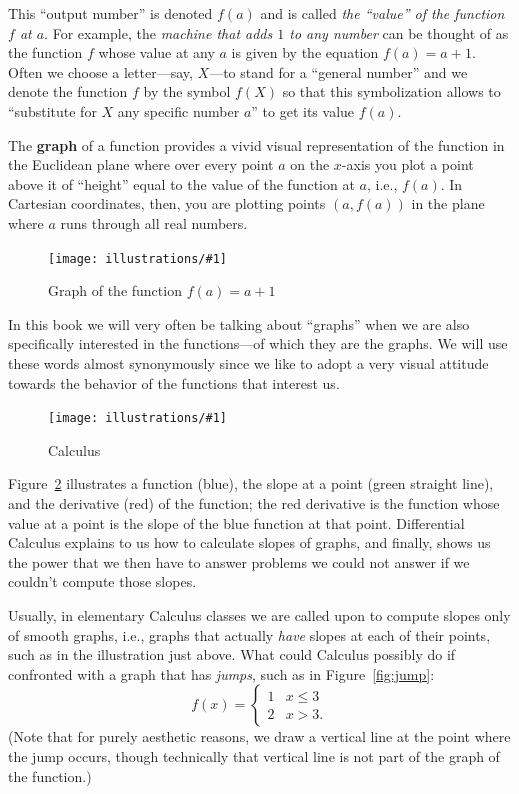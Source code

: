 \documentclass[openany]{book}
\newcommand{\ill}[3]{%
   \begin{figure}[H]%
   \vspace{-2ex}
   \centering%
   \texttt{[image: illustrations/\#1]}%
   \caption{#3}%
   \vspace{-2ex}
    \end{figure}}
\theoremstyle{plain}
\theoremstyle{definition}
\begin{document}
{ This ``output number'' is denoted $f(a)$ and is called {\it the
   ``value'' of the function $f$ at $a$}.  For example, the {\it
   machine that adds $1$ to any number} can be thought of as the
 function $f$ whose value at any $a$ is given by the equation $f(a) =
 a+1$.  Often we choose a letter---say, $X$---to stand for a ``general
 number'' and we denote the function $f$ by the symbol $f(X)$ so that
 this symbolization allows to ``substitute for $X$ any specific number
 $a$'' to get its value $f(a)$.

 The {\bf graph} of a function provides a vivid visual representation of the
 function in the Euclidean plane where over every point $a$ on the
 $x$-axis you plot a point above it of ``height'' equal to the value of
 the function at $a$, i.e., $f(a)$. In Cartesian coordinates, then,
 you are plotting points $(a, f(a))$ in the plane where $a$ runs
 through all real numbers.

 \ill{graph_aplusone}{0.6}{Graph of the function $f(a)=a+1$\label{fig:graph_aplusone}}

 In this book we will very often be talking about ``graphs'' when we
 are also specifically interested in the functions---of which they are
 the graphs. We will use these words almost synonymously since we like
 to adopt a very visual attitude towards the behavior of the functions
 that interest us.


 \ill{graph_slope_deriv}{1}{\label{fig:graph_slope_deriv}Calculus}



 Figure~\ref{fig:graph_slope_deriv} illustrates a function (blue), the
 slope at a point (green straight line), and the derivative (red) of
 the function; the red derivative is the function whose value at a point
 is the slope of the blue function at that point.  Differential
 Calculus explains to us how to calculate slopes of graphs, and
 finally, shows us the power that we then have to answer problems we
 could not answer if we couldn't compute those slopes.

Usually, in elementary Calculus classes we are called upon to compute
slopes only of smooth graphs, i.e., graphs that actually {\em have}
slopes at each of their points, such as in the illustration just
above.  What could Calculus possibly do if confronted with a graph
that has {\em jumps}, such as in Figure~\ref{fig:jump}:
$$f(x) = \begin{cases}1 & x \leq 3\\ 2 & x > 3.\end{cases}$$
(Note that for purely aesthetic reasons, we draw a vertical line at the point where the jump occurs, though technically that vertical line is not part of the graph of the function.)

}
\end{document}
